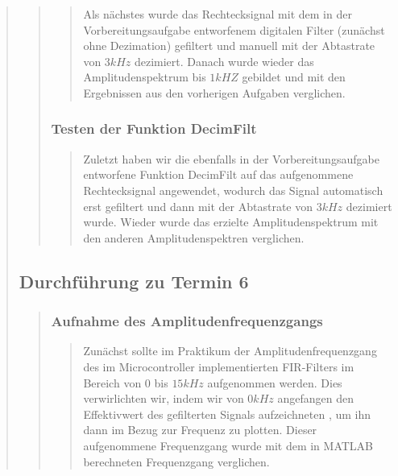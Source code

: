 \begin{quote}
\begin{quote}
\begin{quote}
			Als nächstes wurde das Rechtecksignal mit dem in der Vorbereitungsaufgabe
			entworfenem digitalen Filter (zunächst ohne Dezimation) gefiltert und manuell
			mit der Abtastrate von $3 kHz$ dezimiert. Danach wurde wieder das
			Amplitudenspektrum bis $1 kHZ$ gebildet und mit den Ergebnissen aus den
			vorherigen Aufgaben verglichen.
			
			\end{quote}%
			
			\subsubsection{Testen der Funktion DecimFilt}
			\begin{quote}
			
			Zuletzt haben wir die ebenfalls in der Vorbereitungsaufgabe entworfene
			Funktion DecimFilt auf das aufgenommene Rechtecksignal angewendet, wodurch das
			Signal automatisch erst gefiltert und dann mit der Abtastrate von $3 kHz$
			dezimiert wurde. Wieder wurde das erzielte Amplitudenspektrum mit den anderen
			Amplitudenspektren verglichen.
			
			\end{quote}%

		\end{quote}%
		
		\subsection{Durchführung zu Termin 6}
		\begin{quote}
		
			\subsubsection{Aufnahme des Amplitudenfrequenzgangs}
			\begin{quote}
			
			Zunächst sollte im Praktikum der Amplitudenfrequenzgang des im
			Microcontroller implementierten FIR-Filters im Bereich von $0$ bis $15 kHz$
			aufgenommen werden. Dies verwirlichten wir, indem wir von $0 kHz$ angefangen
			den Effektivwert des gefilterten Signals aufzeichneten , um ihn dann im Bezug
			zur Frequenz zu plotten.
			Dieser aufgenommene Frequenzgang wurde mit dem in MATLAB berechneten
			Frequenzgang verglichen. 
			

\end{quote}
\end{quote}
\end{quote}
